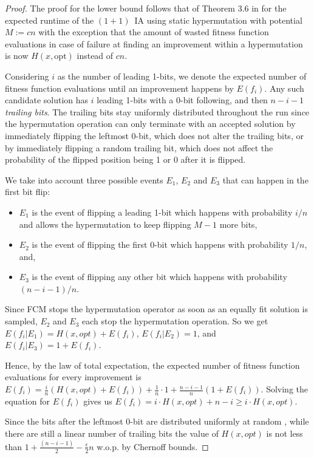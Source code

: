 \documentclass[lettersize,journal]{IEEEtran}
\begin{document}
\begin{proof}

The proof for the lower bound follows that of Theorem 3.6 in \cite{CorusOlivetoYazdaniGECCO2017} for the expected runtime of the $(1+1)$~IA using static hypermutation with potential $M:=cn$ with the exception that the amount of wasted fitness function evaluations in case of failure at finding an improvement within a hypermutation is now $H(x,\text{opt})$ instead of $cn$.


Considering $i$ as the number of leading 1-bits, we denote the expected number of fitness function evaluations until an improvement happens by $E(f_i)$. Any such candidate solution has $i$ leading 1-bits with a 0-bit following, and then $n-i-1$ \emph{trailing bits}. The trailing bits stay uniformly distributed throughout the run since the hypermutation operation can only terminate with an accepted solution by immediately flipping the leftmost $0$-bit, which does not alter the trailing bits, or by immediately flipping a random trailing bit, which does not affect the probability of the flipped position being 1 or 0 after it is flipped\cite{DrosteJansenWegener2002}.  

 We take into account three possible events $E_1$, $E_2$ and $E_3$ that can happen in the first bit flip: 
 \begin{itemize}
\item $E_1$ is the event of flipping a leading 1-bit which happens with probability $i/n$ {\color{black} and allows the hypermutation to keep flipping $M-1$ more bits}, 
\item $E_2$ is the event of flipping the first 0-bit which happens with probability $1/n$, and, 
\item $E_3$ is the event of flipping any other bit which happens with probability $(n-i-1)/n$. 
\end{itemize}
{\color{black}Since FCM stops the hypermutation operator as soon as an equally fit solution is sampled, $E_2$ and $E_3$ each stop the hypermutation operation.} So we get $E(f_i|E_1)=H(x,opt)+ E(f_i)$, $E(f_i|E_2)=1$, and $E(f_i|E_3)=1+ E(f_i)$. 

Hence, by the law of total expectation, the expected number of fitness function evaluations for every improvement is $ E(f_i) = \frac{i}{n} \left( H(x,opt)+ E(f_i)\right) + \frac{1}{n} \cdot 1 +\frac{n-i-1}{n} \left( 1+ E(f_i)\right)$. Solving the equation for $E(f_i)$ gives us $E(f_i)=
i\cdot H(x,opt)+n-i\geq i\cdot H(x,opt) $. 

Since the bits after the leftmost 0-bit are distributed uniformly at random \cite{DrosteJansenWegener2002}, {\color{black} while there are still a linear number of trailing bits} the value of $H(x,opt)$ is not less than $1+ \frac{(n-i-1)}{2}- \frac{\epsilon }{2}n$ w.o.p. by Chernoff bounds. 


\end{proof}
\end{document}
